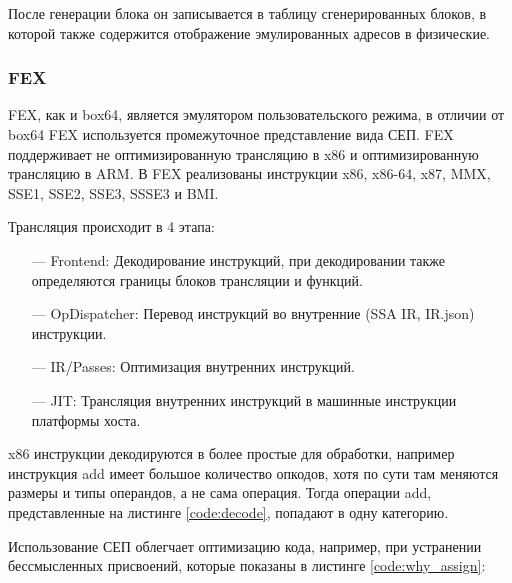 После генерации блока он записывается в таблицу сгенерированных блоков, в которой также содержится отображение эмулированных адресов в физические. \cite{box64_wide}

\subsubsection{FEX}

FEX, как и box64, является эмулятором пользовательского режима, в отличии от box64 FEX используется промежуточное представление вида СЕП. FEX поддерживает не оптимизированную трансляцию в x86 и оптимизированную трансляцию в ARM. В FEX реализованы инструкции x86, x86-64, x87, MMX, SSE1, SSE2, SSE3, SSSE3 и BMI. 

Трансляция происходит в 4 этапа:

\begin{itemize}[leftmargin=1.6\parindent]
	\item[---] Frontend: Декодирование инструкций, при декодировании также определяются границы блоков трансляции и функций.
	\item[---] OpDispatcher: Перевод инструкций во внутренние (SSA IR, IR.json) инструкции.
	\item[---] IR/Passes: Оптимизация внутренних инструкций.
	\item[---] JIT: Трансляция внутренних инструкций в машинные инструкции платформы хоста.
\end{itemize}

x86 инструкции декодируются в более простые для обработки, например инструкция add имеет большое количество опкодов, хотя по сути там меняются размеры и типы операндов, а не сама операция. Тогда операции add, представленные на листинге \ref{code:decode}, попадают в одну категорию.


Использование СЕП облегчает оптимизацию кода, например, при устранении бессмысленных присвоений, которые показаны в листинге \ref{code:why_assign}:


